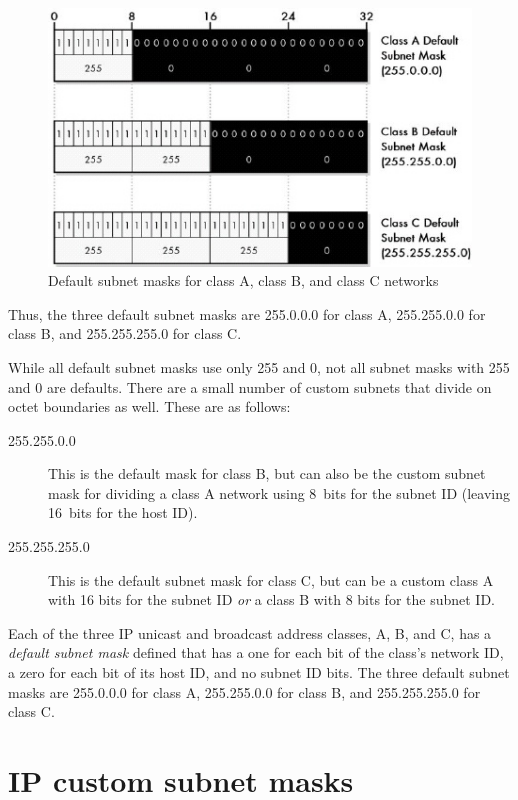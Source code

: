 \begin{figure}
   \centering
   \includegraphics[width=.7\textwidth]{images/default-subnet-masks.jpg}
   \caption{Default subnet masks for class A, class B, and class C networks}
   \label{fig:default-subnet-masks}
\end{figure}

Thus, the three default subnet masks are 255.0.0.0 for class A, 255.255.0.0 for class B, and 255.255.255.0 for class C.

While all default subnet masks use only 255 and 0, not all subnet masks with 255 and 0 are defaults.
There are a small number of custom subnets that divide on octet boundaries as well. These are as follows:

\begin{description}
   \item[255.255.0.0]
      This is the default mask for class B, but can also be the custom subnet mask for dividing a class A network using 8~bits for the subnet ID
      (leaving 16~bits for the host ID).

   \item[255.255.255.0]
      This is the default subnet mask for class C, but can be a custom class A with 16 bits for the subnet ID \emph{or} a class B with 8 bits for the subnet ID.
\end{description}


\begin{keyconcept}
Each of the three IP unicast and broadcast address classes, A, B, and C, has a \emph{default subnet mask} defined
that has a one for each bit of the class's network ID, a zero for each bit of its host ID, and no subnet ID bits.
The three default subnet masks are 255.0.0.0 for class A, 255.255.0.0 for class B, and 255.255.255.0 for class C.
\end{keyconcept}




\section{IP custom subnet masks}
\label{sec:ip-custom-subnet-masks}

